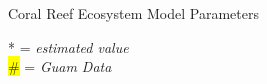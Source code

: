 \documentclass{beamer}
\begin{document}
\begin{frame}{Coral Reef Ecosystem Model Parameters}
{\begin{minipage}{1.20\textwidth}
\begin{table}
\end{table}
\small{* = \textit{estimated value}}\\
\small{\colorbox{yellow}{\#} = \textit{Guam Data}}
\end{minipage}}

\end{frame}
\end{document}
